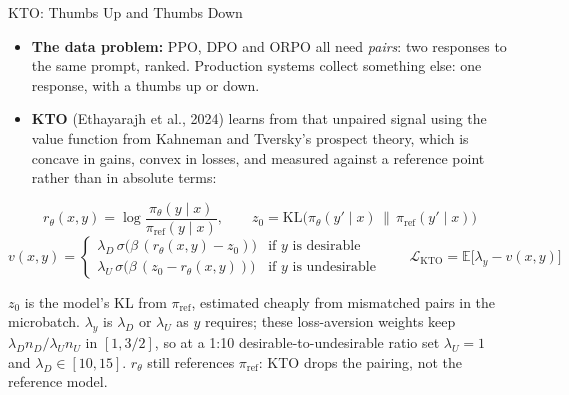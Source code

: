 \begin{frame}[t]{KTO: Thumbs Up and Thumbs Down}
  \begin{itemize}
    \item[\textcolor{red}{$\blacktriangleright$}] \textbf{The data problem:} PPO, DPO and ORPO all need \emph{pairs}: two responses to the same prompt, ranked. Production systems collect something else: one response, with a thumbs up or down.
    \item[\textcolor{red}{$\blacktriangleright$}] \textbf{KTO} (Ethayarajh et al., 2024) learns from that unpaired signal using the value function from Kahneman and Tversky's prospect theory, which is concave in gains, convex in losses, and measured against a reference point rather than in absolute terms:
  \end{itemize}
  \[
    r_\theta(x,y) = \log \frac{\pi_\theta(y \mid x)}{\pi_{\text{ref}}(y \mid x)},
    \qquad
    z_0 = \mathrm{KL}\big(\pi_\theta(y' \mid x)\,\|\,\pi_{\text{ref}}(y' \mid x)\big)
  \]
  \[
    v(x,y) =
    \begin{cases}
      \lambda_D\,\sigma\big(\beta\,(r_\theta(x,y) - z_0)\big) & \text{if } y \text{ is desirable}\\[0.2em]
      \lambda_U\,\sigma\big(\beta\,(z_0 - r_\theta(x,y))\big) & \text{if } y \text{ is undesirable}
    \end{cases}
    \qquad
    \mathcal{L}_{\mathrm{KTO}} = \mathbb{E}\big[\lambda_y - v(x,y)\big]
  \]

  \footnotesize
  $z_0$ is the model's KL from $\pi_{\text{ref}}$, estimated cheaply from mismatched pairs in the microbatch. $\lambda_y$ is $\lambda_D$ or $\lambda_U$ as $y$ requires; these loss-aversion weights keep $\lambda_D n_D / \lambda_U n_U$ in $[1, 3/2]$, so at a 1:10 desirable-to-undesirable ratio set $\lambda_U = 1$ and $\lambda_D \in [10,15]$. $r_\theta$ still references $\pi_{\text{ref}}$: KTO drops the pairing, not the reference model.
\end{frame}

